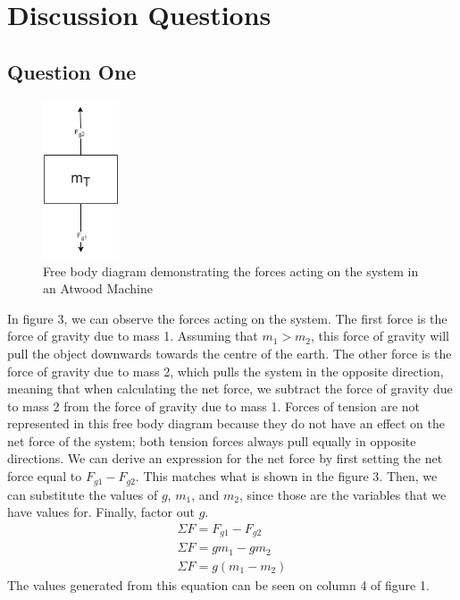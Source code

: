 \documentclass[10pt,twocolumn,letterpaper]{article}
\begin{document}
\section{Discussion Questions}
\subsection{Question One}
\begin{figure}
    \centering
    \includegraphics[width=0.2\textwidth]{figures/fbd.drawio.png}
    \caption{Free body diagram demonstrating the forces acting on the system in an Atwood Machine}
    \label{fig:enter-label}
\end{figure}
In figure 3, we can observe the forces acting on the system. The first force is the force of gravity due to mass 1. Assuming that \(m_{1} > m_{2}\), this force of gravity will pull the object downwards towards the centre of the earth. The other force is the force of gravity due to mass 2, which pulls the system in the opposite direction, meaning that when calculating the net force, we subtract the force of gravity due to mass 2 from the force of gravity due to mass 1. Forces of tension are not represented in this free body diagram because they do not have an effect on the net force of the system; both tension forces always pull equally in opposite directions. 
We can derive an expression for the net force by first setting the net force equal to \(F_{g1} - F_{g2}\). This matches what is shown in the figure 3. Then, we can substitute the values of \(g\), \(m_{1}\), and \(m_{2}\), since those are the variables that we have values for. Finally, factor out \(g\).
\begin{align}
    \nonumber \Sigma F = F_{g1} - F_{g2} \\
    \nonumber \Sigma F = gm_{1} - gm_{2} \\
    \nonumber \Sigma F = g(m_{1} - m_{2})
\end{align}
The values generated from this equation can be seen on column 4 of figure 1. 
\end{document}
